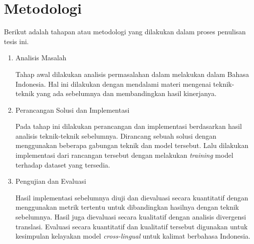 \section{Metodologi}

Berikut adalah tahapan atau metodologi yang dilakukan dalam proses penulisan tesis ini.

\begin{enumerate}
  \item Analisis Masalah

  Tahap awal dilakukan analisis permasalahan dalam melakukan \amrparsing{} dalam Bahasa Indonesia.
  Hal ini dilakukan dengan mendalami materi mengenai teknik-teknik \amrparsing{} yang ada sebelumnya dan membandingkan hasil kinerjanya.

  \item Perancangan Solusi dan Implementasi

  Pada tahap ini dilakukan perancangan dan implementasi berdasarkan hasil analisis teknik-teknik \amrparsing{} sebelumnya.
  Dirancang sebuah solusi dengan menggunakan beberapa gabungan teknik dan model tersebut.
  Lalu dilakukan implementasi dari rancangan tersebut dengan melakukan \textit{training} model terhadap dataset yang tersedia.

  \item Pengujian dan Evaluasi

  Hasil implementasi sebelumnya diuji dan dievaluasi secara kuantitatif dengan menggunakan metrik tertentu untuk dibandingkan hasilnya dengan teknik sebelumnya.
  Hasil \amrparsing{} juga dievaluasi secara kualitatif dengan analisis divergensi translasi.
  Evaluasi secara kuantitatif dan kualitatif tersebut digunakan untuk kesimpulan kelayakan model \amrparsing{} \textit{cross-lingual} untuk kalimat berbahasa Indonesia.

\end{enumerate}
